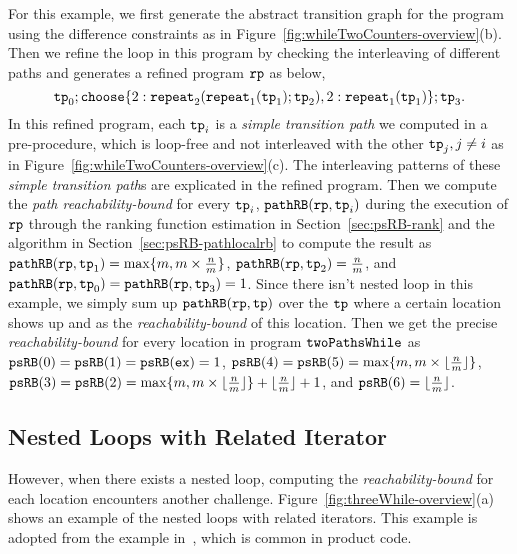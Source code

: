 For this example, we first
generate the abstract transition graph for the program using the difference constraints as in Figure~\ref{fig:whileTwoCounters-overview}(b).
Then we refine the loop in this program by checking the interleaving of different paths and
generates a refined program $\mathtt{rp}$ as below,
% 
\[ 
  \tpath_0 ; 
 \rpchoose{2: \rprepeat_2(\rprepeat_1(\tpath_1); \tpath_2), 
 2: \rprepeat_1(\tpath_1)}; \tpath_3.
\]
In this refined program,
each $\mathtt{tp}_i$ is a \emph{simple transition path} we computed in a pre-procedure, which is loop-free and not interleaved with the other $\mathtt{tp}_j, j \neq i$ as in Figure~\ref{fig:whileTwoCounters-overview}(c).
The interleaving patterns of these \emph{simple transition path}s are explicated in the refined program.
Then we compute the \emph{path reachability-bound} for every $\mathtt{tp}_i$,
$\mathtt{pathRB}(\mathtt{rp}, \mathtt{tp}_i)$ during the execution of $\mathtt{rp}$ through the ranking function estimation in Section~\ref{sec:psRB-rank} and the algorithm in Section~\ref{sec:psRB-pathlocalrb} to compute the result as
$\mathtt{pathRB}(\mathtt{rp}, \mathtt{tp}_1) = \max\{m, m \times \frac{n}{m} \}$,
$\mathtt{pathRB}(\mathtt{rp}, \mathtt{tp}_2) = \frac{n}{m}$,
and $\mathtt{pathRB}(\mathtt{rp}, \mathtt{tp}_0) = \mathtt{pathRB}(\mathtt{rp}, \mathtt{tp}_3) = 1$.
Since there isn't nested loop in this example, we simply sum up $\mathtt{pathRB}(\mathtt{rp}, \mathtt{tp})$ over the $\mathtt{tp}$ where a certain location shows up
and as the \emph{reachability-bound} of this location.
Then we get the precise \emph{reachability-bound} for every location in program $\mathtt{twoPathsWhile}$ as
$\mathtt{psRB}(0) = \mathtt{psRB}(1) = \mathtt{psRB}(\mathtt{ex}) = 1$,
$\mathtt{psRB}(4) = \mathtt{psRB}(5) = \max\{m, m \times \lfloor\frac{n}{m}\rfloor\}$,
$\mathtt{psRB}(3) = \mathtt{psRB}(2) = \max\{m, m \times \lfloor\frac{n}{m}\rfloor\} + \lfloor\frac{n}{m}\rfloor + 1 $,
and $\mathtt{psRB}(6) = \lfloor\frac{n}{m}\rfloor$.
%
\subsection{Nested Loops with Related Iterator}
\label{sec:overview-nestedwhile}
However, when there exists a nested loop, computing the \emph{reachability-bound} for each location encounters another challenge.
Figure~\ref{fig:threeWhile-overview}(a) shows an example of the nested loops with related 
iterators.
This example is adopted from the example in~\cite{GulwaniJK09}, which is common in product code.

